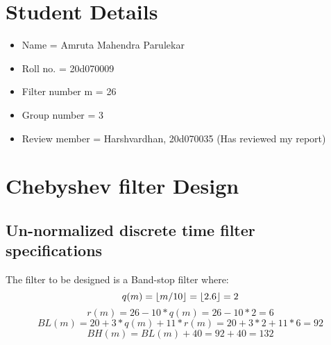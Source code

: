 \documentclass[12pt]{article}
\DeclarePairedDelimiter\floor{\lfloor}{\rfloor}
\begin{document}

\newpage
\tableofcontents
\newpage
\section{Student Details} %
\begin{itemize}[nolistsep]
    \item Name = Amruta Mahendra Parulekar
    \item Roll no. = 20d070009
    \item Filter number m = 26
    \item Group number = 3
    \item Review member = Harshvardhan, 20d070035 (Has reviewed my report)
\end{itemize}
\section{Chebyshev filter Design}
\subsection{Un-normalized discrete time filter specifications}

  
    The filter to be designed is a Band-stop filter where:
    \begin{equation}
        q(m) = \floor{m/10} = \floor{2.6} = 2
    \end{equation}
    \begin{equation}
        r(m) = 26 - 10*q(m) = 26 - 10*2 = 6
    \end{equation}
    \begin{equation}
        BL(m) = 20 + 3*q(m) + 11*r(m) = 20 + 3*2 + 11*6 = 92
    \end{equation}
    \begin{equation}
        BH(m) = BL(m) + 40 = 92 + 40 = 132
    \end{equation}
  
\end{document}
